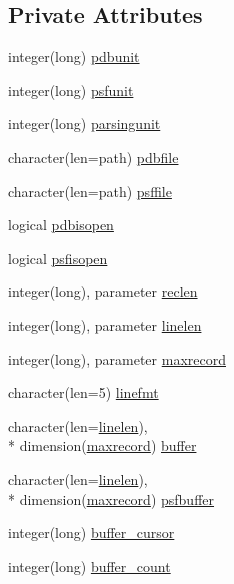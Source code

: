 \subsection*{Private Attributes}
\begin{DoxyCompactItemize}
\item 
integer(long) \hyperlink{classmolreader_a5b0570862e5318937ea68a01966ed56f}{pdbunit}
\item 
integer(long) \hyperlink{classmolreader_a2b57a032db6161c98961f5e8109c3b90}{psfunit}
\item 
integer(long) \hyperlink{classmolreader_ac41219b2f68591f315dded4488483263}{parsingunit}
\item 
character(len=path) \hyperlink{classmolreader_aa372f060e4e581b1c14e2b46a65d2df4}{pdbfile}
\item 
character(len=path) \hyperlink{classmolreader_a48ac5c969e35417342bb66a57adec842}{psffile}
\item 
logical \hyperlink{classmolreader_ad7636360c8e0ecb526000567dd32d2d0}{pdbisopen}
\item 
logical \hyperlink{classmolreader_ae5cd9063d12a39b0e8266e184439c808}{psfisopen}
\item 
integer(long), parameter \hyperlink{classmolreader_a8f12be3272b946fd698c9fbaf2ba9d32}{reclen}
\item 
integer(long), parameter \hyperlink{classmolreader_acd493d996a1fcd0ed77937e925c9b7fe}{linelen}
\item 
integer(long), parameter \hyperlink{classmolreader_a7192fdfba4bcb0ee7504a9c6695c7106}{maxrecord}
\item 
character(len=5) \hyperlink{classmolreader_ac14650c697f68fd15530b93807e3f42f}{linefmt}
\item 
character(len=\hyperlink{classmolreader_acd493d996a1fcd0ed77937e925c9b7fe}{linelen}), \\*
dimension(\hyperlink{classmolreader_a7192fdfba4bcb0ee7504a9c6695c7106}{maxrecord}) \hyperlink{classmolreader_a06d78b69405420664607fb01b4d8e97a}{buffer}
\item 
character(len=\hyperlink{classmolreader_acd493d996a1fcd0ed77937e925c9b7fe}{linelen}), \\*
dimension(\hyperlink{classmolreader_a7192fdfba4bcb0ee7504a9c6695c7106}{maxrecord}) \hyperlink{classmolreader_aab845daa54f6803a37ceb91d7ad296a7}{psfbuffer}
\item 
integer(long) \hyperlink{classmolreader_a7b2e4f11efe55d80469efa3f7aeacbab}{buffer\+\_\+cursor}
\item 
integer(long) \hyperlink{classmolreader_ac7969154d301aab4a51cde89ec2f08ee}{buffer\+\_\+count}

\end{DoxyCompactItemize}

